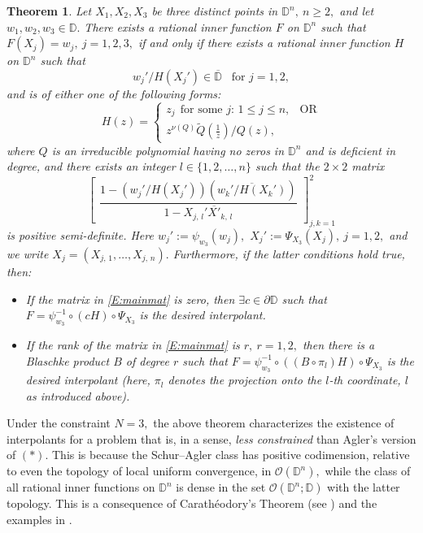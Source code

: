 \documentclass[11pt, reqno]{amsart}
\numberwithin{equation}{section}
\theoremstyle{definition}
\theoremstyle{remark}
\theoremstyle{plain}
\newtheorem{theorem}[definition]{Theorem}
\begin{document}
\begin{theorem}\label{T:mainThm}
Let $X_1,X_2,X_3$ be three distinct points in ${\mathbb{D}}^n, \ n\geq 2,$ and let $w_1,w_2,w_3\in{\mathbb{D}}.$ There exists
a rational inner function $F$ on ${\mathbb{D}}^n$ such that $F(X_j)=w_j, \ j=1,2,3,$ if and only if there exists a 
rational inner function $H$ on ${\mathbb{D}}^n$ such that
\[
 w_j'/H(X_j')\in\overline{\mathbb{D}}\;\;\;\text{for $j=1,2$},
\]
and is of either one of the following forms:
\[
 H(z) = \begin{cases}
 		z_j \ \ \text{for some $j:\,1\leq j\leq n$}, &\!\!\!\text{OR} \\
 		z^{\nu(Q)}\widetilde{Q}(\frac{1}{z})/Q(z), &{ \ }
 		\end{cases}
\]
where $Q$ is an irreducible polynomial having no zeros in ${\mathbb{D}}^n$ and is deficient in degree,
and there exists an integer $l\in\{1,2,\ldots,n\}$ such that the $2\times 2$ matrix
\begin{equation}
{\begin{bmatrix}
\dfrac{1-({w_j'}/{H(X_j')})(\overline{{w_k'}/{H(X_k')}})}{1-X_{j,\,l}'\overline{X'}_{k,\,l}}
\end{bmatrix}}_{j,k=1}^{2}\label{E:mainmat}
\end{equation}
 is positive semi-definite. Here $w_j':=\psi_{w_3}(w_j),$ $X_j':=\Psi_{X_3}(X_j), \ j=1,2,$ and we write
 $X_j=(X_{j,\,1},\ldots,X_{j,\,n}).$ Furthermore, if the latter conditions hold true, then:
\begin{itemize}
\item[$a)$] If the matrix in \eqref{E:mainmat} is zero, then $\exists c\in\partial{\mathbb{D}}$ such that
 $F={\psi}^{-1}_{w_3}\circ(cH)\circ\Psi_{X_3}$ is the desired interpolant.
\item[$b)$] If the rank of the matrix in \eqref{E:mainmat} is $r, \ r=1,2,$ then there is a
 Blaschke product $B$ of degree $r$ such that $F={\psi}^{-1}_{w_3}\circ((B\circ \pi_l)H)\circ\Psi_{X_3}$ is the desired interpolant
(here, $\pi_l$ denotes the projection onto the $l$-th coordinate, $l$ as introduced above).
\end{itemize}
\end{theorem}
\smallskip

Under the constraint $N=3,$ the above theorem characterizes the existence of interpolants
for a problem that is, in a sense, {\em less constrained} than Agler's version of $(*).$ This is because the Schur--Agler class
has positive codimension, relative to even the topology of local uniform convergence, in ${\mathcal{O}}({\mathbb{D}}^n),$ while the class of 
all rational inner functions on ${\mathbb{D}}^n$ is dense in the set ${\mathcal{O}}({\mathbb{D}}^n;{\mathbb{D}})$ with the latter topology. This is a consequence of
Carath{\'e}odory's Theorem (see \cite[Theorem 5.5.1]{rudin:ftp69}) and the examples in
\cite[Section 5]{ana:ftp012}.
\smallskip
\end{document}
